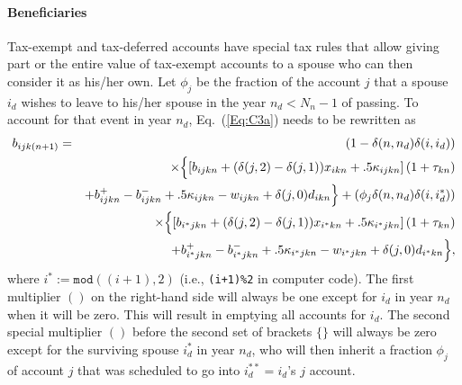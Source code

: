 \documentclass{article}[fleqn,12pt]
\begin{document}
\paragraph*{Beneficiaries}
Tax-exempt and tax-deferred accounts have special tax rules that allow giving part
or the entire value of
tax-exempt accounts to a spouse who can then consider it as his/her own.
Let $\phi_j$ be the fraction of the account $j$ that a spouse $i_d$ wishes
to leave to his/her spouse
in the year $n_d < N_n - 1$ of passing. 
To account for that event in year $n_d$, Eq.~(\ref{Eq:C3a}) needs to be rewritten as
\begin{eqnarray}
	b_{ijk(n+1)} &=& (1 - \delta(n, n_d)\delta(i, i_d)) \nonumber \\
	&&\times \Bigl\{\left[b_{ijkn} + (\delta(j, 2) - \delta(j, 1))x_{ikn}
	+ .5\kappa_{ijkn}\right](1 + \tau_{kn}) 
	\nonumber \\
	&& +  b^+_{ijkn} - b^-_{ijkn} + .5 \kappa_{ijkn} - w_{ijkn} + \delta(j, 0)d_{ikn} \Bigr\}
	+ (\phi_j\delta(n, n_d)\delta(i, i_d^*)) \nonumber  \\
	&& \times \Bigl\{\left[b_{i^*jkn} + (\delta(j, 2) - \delta(j, 1))x_{i^*kn}
	+ .5\kappa_{i^*jkn}\right](1 + \tau_{kn}) 
	\nonumber \\
	&& + b^+_{i^*jkn} - b^-_{i^*jkn} + .5 \kappa_{i^*jkn} - w_{i^*jkn} + \delta(j, 0)d_{i^*kn}\Bigr\} ,
\end{eqnarray}
where $i^* := \texttt{mod}((i + 1), 2)$ (i.e., \texttt{(i+1)\%2} in computer code).
The first multiplier $()$ on the right-hand side will always be one except for $i_d$ in
year $n_d$ when it will be zero. This will result in emptying all accounts for $i_d$.
The second special multiplier $()$ before the second set of brackets
$\{\}$ will always be zero except for the surviving
spouse $i^*_d$ in year $n_d$, who will then inherit a fraction $\phi_j$ of account $j$ that
was scheduled to go into $i_d^{**} = i_d$'s $j$ account.
\end{document}

